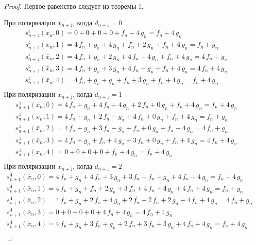 \documentclass[a4paper, 12pt]{article}
\begin{document}
 \begin{proof}

Первое равенство следует из теоремы 1.

При поляризации $x_{n+1}$, когда $d_{n+1} = 0$
$$\begin{array}{l}
s_{n+1}^4(\bar{x}_n, 0) = 0 + 0 + 0 + 0 + f_n + 4\,g_n = f_n + 4\,g_n \\
s_{n+1}^4(\bar{x}_n, 1) = 4\,f_n + g_n + 4\,g_n + f_n + 2\,g_n + f_n + 4\,g_n = f_n + g_n \\
s_{n+1}^4(\bar{x}_n, 2) = 4\,f_n + g_n + 2\,g_n + 4\,f_n + 4\,g_n + f_n + 4\,g_n = 4\,f_n + g_n \\
s_{n+1}^4(\bar{x}_n, 3) = 4\,f_n + g_n + 3\,g_n + 4\,f_n + g_n + f_n + 4\,g_n = 4\,f_n + 4\,g_n \\
s_{n+1}^4(\bar{x}_n, 4) = 4\,f_n + g_n + g_n + f_n + 3\,g_n + f_n + 4\,g_n = f_n + 4\,g_n \\
\end{array}$$
При поляризации $x_{n+1}$, когда $d_{n+1} = 1$
$$\begin{array}{l}
s_{n+1}^4(\bar{x}_n, 0) = 4\,f_n + g_n + 4\,f_n + 4\,g_n + 2\,f_n + 0\,g_n + f_n + 4\,g_n = f_n + 4\,g_n \\
s_{n+1}^4(\bar{x}_n, 1) = 4\,f_n + g_n + 2\,f_n + g_n + 4\,f_n + 0\,g_n + f_n + 4\,g_n = f_n + g_n \\
s_{n+1}^4(\bar{x}_n, 2) = 4\,f_n + g_n + 3\,f_n + g_n + f_n + 0\,g_n + f_n + 4\,g_n = 4\,f_n + g_n \\
s_{n+1}^4(\bar{x}_n, 3) = 4\,f_n + g_n + f_n + 4\,g_n + 3\,f_n + 0\,g_n + f_n + 4\,g_n = 4\,f_n + 4\,g_n \\
s_{n+1}^4(\bar{x}_n, 4) = 0 + 0 + 0 + 0 + f_n + 4\,g_n = f_n + 4\,g_n \\
\end{array}$$
При поляризации $x_{n+1}$, когда $d_{n+1} = 2$
$$\begin{array}{l}
s_{n+1}^4(\bar{x}_n, 0) = 4\,f_n + g_n + 4\,f_n + 3\,g_n + 3\,f_n + f_n + g_n + 4\,f_n + 4\,g_n = f_n + 4\,g_n \\
s_{n+1}^4(\bar{x}_n, 1) = 4\,f_n + g_n + f_n + 2\,g_n + 3\,f_n + 4\,f_n + 4\,g_n + 4\,f_n + 4\,g_n = f_n + g_n \\
s_{n+1}^4(\bar{x}_n, 2) = 4\,f_n + g_n + 2\,f_n + 4\,g_n + 2\,f_n + 2\,f_n + 2\,g_n + 4\,f_n + 4\,g_n = 4\,f_n + g_n \\
s_{n+1}^4(\bar{x}_n, 3) = 0 + 0 + 0 + 0 + 4\,f_n + 4\,g_n = 4\,f_n + 4\,g_n \\
s_{n+1}^4(\bar{x}_n, 4) = 4\,f_n + g_n + 3\,f_n + g_n + 2\,f_n + 3\,f_n + 3\,g_n + 4\,f_n + 4\,g_n = f_n + 4\,g_n \\

\end{array}$$
\end{proof}
\end{document}
